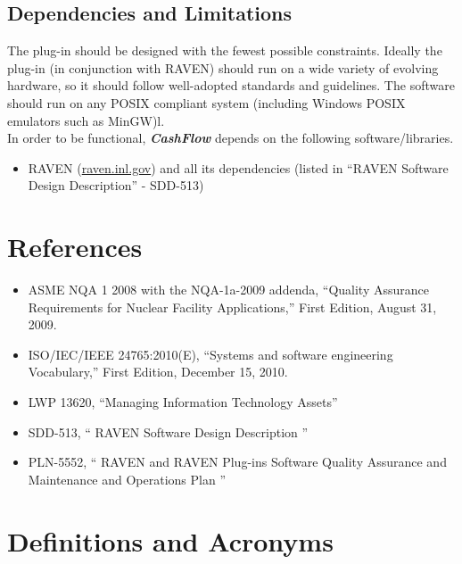 \subsection{Dependencies and Limitations}
The plug-in should be designed with the fewest possible constraints. 
Ideally the  plug-in (in conjunction with RAVEN)
 should run on a wide variety of evolving hardware, 
so it should follow well-adopted standards and guidelines. The software
 should run on any POSIX compliant system (including Windows POSIX 
 emulators such as MinGW)l. 
\\In order to be functional, \textit{\textbf{CashFlow}} depends on the following software/libraries.
\begin{itemize}
  \item RAVEN (\url{raven.inl.gov}) and all its dependencies (listed in ``RAVEN Software Design Description'' - SDD-513)
\end{itemize}


\section{References}

\begin{itemize}

  \item ASME NQA 1 2008 with the NQA-1a-2009 addenda, ``Quality Assurance Requirements for Nuclear Facility Applications,'' First Edition, August 31, 2009.
  \item ISO/IEC/IEEE 24765:2010(E), ``Systems and software engineering Vocabulary,'' First Edition, December 15, 2010.
  \item LWP 13620, ``Managing Information Technology Assets''
  \item SDD-513, `` RAVEN Software Design Description ''
  \item PLN-5552, `` RAVEN and RAVEN Plug-ins Software Quality Assurance and Maintenance and Operations Plan ''
\end{itemize}


\section{Definitions and Acronyms}

